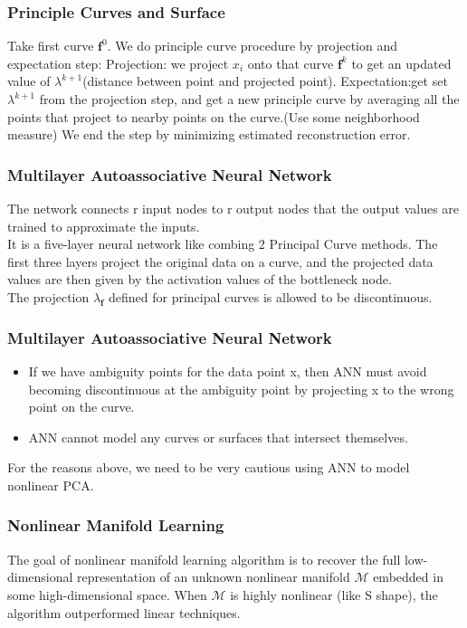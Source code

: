 \documentclass{beamer}
\begin{document}
\begin{frame}
\frametitle{Principle Curves and Surface}
Take first curve $\textbf{f}^0$. We do principle curve procedure by projection and expectation step:\newline
Projection: we project $x_i$ onto that curve $\textbf{f}^k$ to get an updated value of $\lambda^{k+1}$(distance between point and projected point).\newline
Expectation:get set $\lambda^{k+1}$ from the projection step, and get a new principle curve by averaging all the points that project to nearby points on the curve.(Use some neighborhood measure)\newline
We end the step by minimizing estimated reconstruction error.
\end{frame}

\begin{frame}
\frametitle{Multilayer Autoassociative Neural Network}
The network connects r input nodes to r output nodes that the output values are trained to approximate the inputs.\\
It is a five-layer neural network like combing 2 Principal Curve methods. The first three layers project the original data on a curve, and the projected data values are then given by the activation values of the bottleneck node.\\
The projection $\lambda_{\textbf{f}}$ defined for principal curves is allowed to be discontinuous.
\end{frame}

\begin{frame}
\frametitle{Multilayer Autoassociative Neural Network}
\begin{itemize}
  \item If we have ambiguity points for the data point x, then ANN must avoid becoming discontinuous at the ambiguity point by projecting x to the wrong point on the curve.
  \item ANN cannot model any curves or surfaces that intersect themselves. 
\end{itemize}
For the reasons above, we need to be very cautious using ANN to model nonlinear PCA.
\end{frame}


\begin{frame}

\frametitle{Nonlinear Manifold Learning}

The goal of nonlinear manifold learning algorithm is to recover the full low-dimensional representation of an unknown nonlinear manifold $\mathcal{M}$ embedded in some high-dimensional space. \newline \newline
When $\mathcal{M}$ is highly nonlinear (like S shape), the algorithm outperformed linear techniques.

\end{frame}
\end{document}
